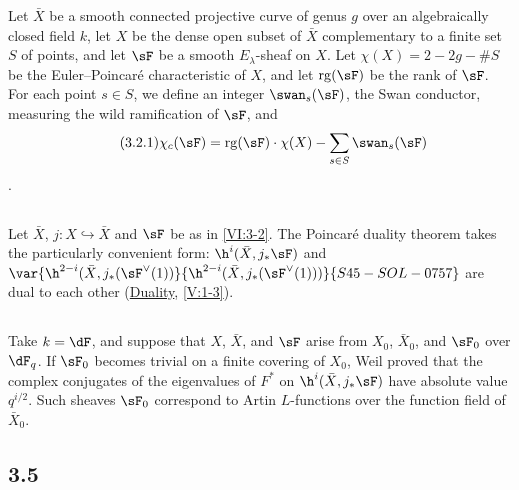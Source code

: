 Let $\bar X$ be a smooth connected projective curve of genus $g$ over an 
algebraically closed field $k$, let $X$ be the dense open subset of $\bar X$ 
complementary to a finite set $S$ of points, and let $\sF$ be a 
smooth $E_\lambda$-sheaf on $X$. Let $\chi(X)=2-2 g-\# S$ be the 
Euler--Poincaré characteristic of $X$, and let $\operatorname{rg}(\sF)$ be the 
rank of $\sF$. For each point $s\in S$, we define an integer 
$\swan_s(\sF)$, the Swan conductor, measuring the wild ramification of 
$\sF$, and 
\begin{align*}\tag{3.2.1}\label{VI:eq:3-2-1}
  \chi_c(\sF) = \operatorname{rg}(\sF) \cdot \chi(X) - \sum_{s\in S} \swan_s(\sF) 
\end{align*}
. 





\subsection{}\label{VI:3-3}

Let $\bar X$, $j:X\hookrightarrow\bar X$ and $\sF$ be as in \ref{VI:3-2}. The 
Poincaré duality theorem takes the particularly convenient form: 
$\h^i(\bar X,j_\ast \sF)$ and $\var{\h^{2-i}(\bar X,j_\ast(\sF^\vee(1))}{\h^{2-i}(\bar X,j_\ast(\sF^\vee(1)))}{S45-SOL-0757}$ are 
dual to each other (\hyperref[V]{Duality}, \ref{V:1-3}). 





\subsection{}\label{VI:3-4}

Take $k=\dF$, and suppose that $X$, $\bar X$, and $\sF$ arise from 
$X_0$, $\bar X_0$, and $\sF_0$ over $\dF_q$. If $\sF_0$ becomes trivial on a 
finite covering of $X_0$, Weil proved that the complex conjugates of 
the eigenvalues of $F^\ast$ on $\h^i(\bar X,j_\ast\sF)$ have absolute value 
$q^{i/2}$. Such sheaves $\sF_0$ correspond to Artin $L$-functions 
over the function field of $\bar X_0$. 





\subsection*{3.5}\label{VI:3-5_} %

